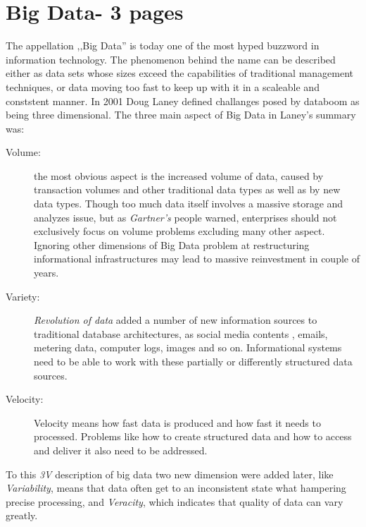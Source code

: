 \section{Big Data- 3 pages}
The appellation ,,Big Data'' is today one of the most hyped buzzword in information technology. The phenomenon behind the name can be described either 
as data sets whose sizes  exceed the capabilities of traditional management techniques, or data moving too fast to keep up with it in a scaleable and 
conststent manner. In 2001 Doug Laney defined challanges posed by databoom as being three dimensional\cite{3v}. The three main aspect of Big Data in Laney's summary was:
\begin{description}

\item[Volume:]
 the most obvious aspect is the increased volume of data, caused by transaction volumes and other traditional data types as well as by new data types. 
Though too much data itself involves a massive storage and analyzes issue, but as \textit{Gartner's} people warned\cite{3v},  enterprises should not exclusively focus on volume problems excluding many other aspect. Ignoring other dimensions of Big Data problem at restructuring  informational infrastructures may lead to massive reinvestment in couple of years. 
\item[Variety:] \textit{Revolution of data} added a number of new information sources to traditional database architectures, as social media contents , emails,  metering data, 
computer logs, images and so on. Informational systems need to be able to work with these partially or differently structured data sources. 
\item[Velocity:] Velocity means how fast data is produced and how fast it needs to processed. Problems like how to create structured data and
 how to access and deliver it also need to be addressed.
\end{description}
To this \textit{3V} description of big data two new dimension were added later, like \textit{Variability}, means that data often get to an inconsistent state what hampering precise processing, and \textit{Veracity}, which indicates that quality of data can vary greatly. 

